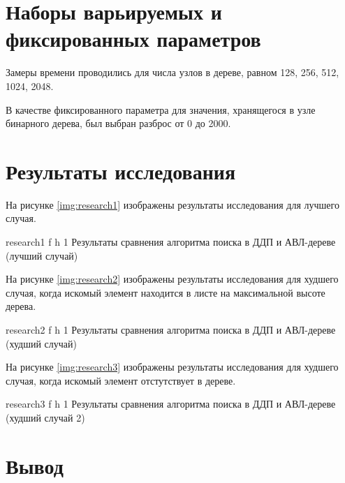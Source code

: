 \section*{Наборы варьируемых и фиксированных параметров}

Замеры времени проводились для числа узлов в дереве, равном 128, 256, 512, 1024, 2048.

В качестве фиксированного параметра для значения, хранящегося в узле бинарного дерева, был выбран разброс от 0 до 2000.

\section*{Результаты исследования}

На рисунке \ref{img:research1} изображены результаты исследования для лучшего случая.

{research1} %
{f} %
{h} %
{1\textwidth} %
{Результаты сравнения алгоритма поиска в ДДП и АВЛ-дереве (лучший случай)} %

\clearpage

На рисунке \ref{img:research2} изображены результаты исследования для худшего случая, когда искомый элемент находится в листе на максимальной высоте дерева.

{research2} %
{f} %
{h} %
{1\textwidth} %
{Результаты сравнения алгоритма поиска в ДДП и АВЛ-дереве (худший случай)} %
\clearpage

На рисунке \ref{img:research3} изображены результаты исследования для худшего случая, когда искомый элемент отстутствует в дереве.

{research3} %
{f} %
{h} %
{1\textwidth} %
{Результаты сравнения алгоритма поиска в ДДП и АВЛ-дереве (худший случай 2)} %

\section*{Вывод}


